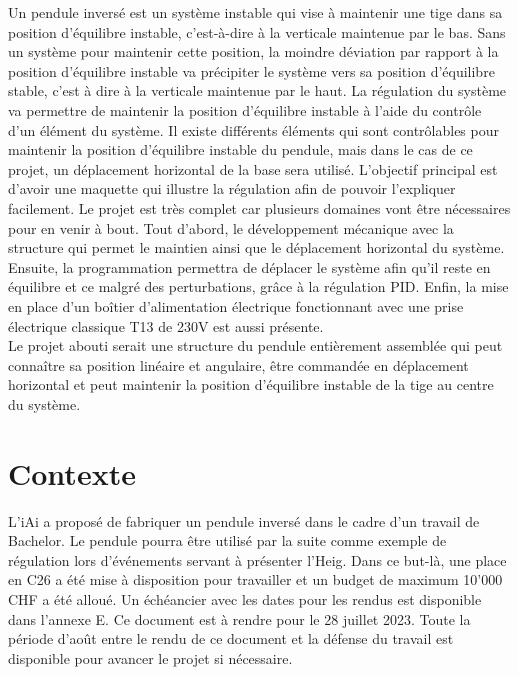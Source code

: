 Un pendule inversé est un système instable qui vise à maintenir une tige dans sa position d'équilibre instable, c'est-à-dire à la verticale
maintenue par le bas. Sans un système pour maintenir cette position, la moindre déviation par rapport à la position d'équilibre instable va
précipiter le système vers sa position d'équilibre stable, c'est à dire à la verticale maintenue par le haut. La régulation du système va
permettre de maintenir la position d'équilibre instable à l'aide du contrôle d'un élément du système. Il existe différents éléments qui sont
contrôlables pour maintenir la position d'équilibre instable du pendule, mais dans le cas de ce projet, un déplacement horizontal de la base
sera utilisé. L'objectif principal est d'avoir une maquette qui illustre la régulation afin de pouvoir l'expliquer facilement. Le projet est
très complet car plusieurs domaines vont être nécessaires pour en venir à bout. Tout d'abord, le développement mécanique avec la structure
qui permet le maintien ainsi que le déplacement horizontal du système. Ensuite, la programmation permettra de déplacer le système afin qu'il
reste en équilibre et ce malgré des perturbations, grâce à la régulation \gls{PID}. Enfin, la mise en place
d'un boîtier d'alimentation électrique fonctionnant avec une prise électrique classique T13 de 230V est aussi présente.\\

Le projet abouti serait une structure du pendule entièrement assemblée qui peut connaître sa position linéaire et angulaire, être commandée
en déplacement horizontal et peut maintenir la position d'équilibre instable de la tige au centre du système.

\section{Contexte}
L'\acrlong{iAi} a proposé de fabriquer un pendule inversé dans le cadre d'un travail
de Bachelor. Le pendule pourra être utilisé par la suite comme exemple de régulation lors d'événements servant à présenter l'\acrshort{Heig}.
Dans ce but-là, une place en C26 a été mise à disposition pour travailler et un budget de maximum 10'000 CHF a été alloué. Un échéancier
avec les dates pour les rendus est disponible dans l'annexe E. Ce document est à rendre pour le 28 juillet 2023. Toute la période d'août entre
le rendu de ce document et la défense du travail est disponible pour avancer le projet si nécessaire.